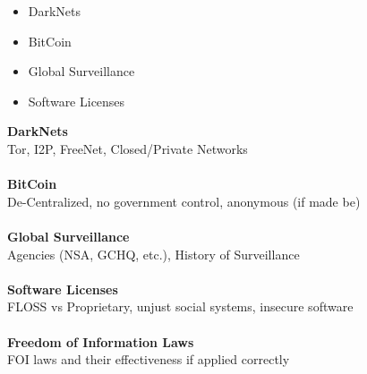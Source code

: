 \documentclass[13pt]{article}
\begin{document}
\begin{itemize}
		\item DarkNets
		\item BitCoin
		\item Global Surveillance
		\item Software Licenses
\end{itemize}
\vspace{4mm}
\begin{tabbing}
	\textbf{DarkNets} \hspace{1mm} \= \\
	\> Tor, I2P, FreeNet, Closed/Private Networks \\\\
	\textbf{BitCoin} \\
	\> De-Centralized, no government control, anonymous (if made be) \\\\
	\textbf{Global Surveillance} \\
	\> Agencies (NSA, GCHQ, etc.), History of Surveillance \\\\
	\textbf{Software Licenses} \\
	\> FLOSS vs Proprietary, unjust social systems, insecure software \\\\
	\textbf{Freedom of Information Laws} \\
	\> FOI laws and their effectiveness if applied correctly \\\\
\end{tabbing}
\end{document}
